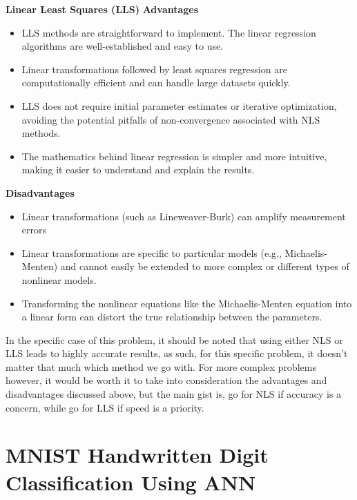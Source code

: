 \documentclass{article} %
\theoremstyle{definition}
\theoremstyle{remark}
\theoremstyle{plain}
\begin{document}
\textbf{Linear Least Squares (LLS)}
\textbf{Advantages}
\begin{itemize}[label={--}]
    \item LLS methods are straightforward to implement. The linear regression algorithms are well-established and easy to use.
    \item Linear transformations followed by least squares regression are computationally efficient and can handle large datasets quickly.
    \item LLS does not require initial parameter estimates or iterative optimization, avoiding the potential pitfalls of non-convergence associated with NLS methods.
    \item The mathematics behind linear regression is simpler and more intuitive, making it easier to understand and explain the results.
\end{itemize}
\textbf{Disadvantages}
\begin{itemize}[label={--}]
    \item Linear transformations (such as Lineweaver-Burk) can amplify measurement errors
    \item Linear transformations are specific to particular models (e.g., Michaelis-Menten) and cannot easily be extended to more complex or different types of nonlinear models.
    \item Transforming the nonlinear equations like the Michaelis-Menten equation into a linear form can distort the true relationship between the parameters.
\end{itemize}

In the specific case of this problem, it should be noted that using either NLS or LLS leads to highly accurate results, as such, for this specific problem, it doesn't matter that much which method we go with. For more complex problems however, it would be worth it to take into consideration the advantages and disadvantages discussed above, but the main gist is, go for NLS if accuracy is a concern, while go for LLS if speed is a priority.










\pagebreak

\section{MNIST Handwritten Digit Classification Using ANN}
\end{document}
